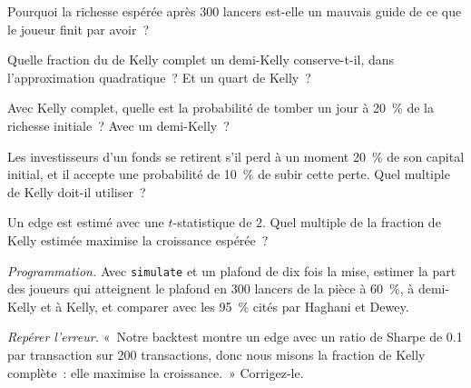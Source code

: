 \begin{exercise}[$\star$]\label{exo:m2:thinking-in-expected-value:2}
Pourquoi la richesse espérée après 300 lancers est-elle un mauvais guide de ce que le joueur finit par avoir~?
\end{exercise}

\begin{exercise}[$\star$]\label{exo:m2:thinking-in-expected-value:3}
Quelle fraction du  de Kelly complet un demi-Kelly conserve-t-il, dans l'approximation
quadratique~? Et un quart de Kelly~?
\end{exercise}

\begin{exercise}[$\star\star$]\label{exo:m2:thinking-in-expected-value:4}
Avec Kelly complet, quelle est la probabilité de tomber un jour à 20~\% de la richesse initiale~? Avec
un demi-Kelly~?
\end{exercise}

\begin{exercise}[$\star\star$]\label{exo:m2:thinking-in-expected-value:5}
Les investisseurs d'un fonds se retirent s'il perd à un moment 20~\% de son capital initial, et il accepte
une probabilité de 10~\% de subir cette perte. Quel multiple de Kelly doit-il utiliser~?
\end{exercise}

\begin{exercise}[$\star\star$]\label{exo:m2:thinking-in-expected-value:6}
Un edge est estimé avec une $t$-statistique de 2. Quel multiple de la fraction de Kelly estimée
maximise la croissance espérée~?
\end{exercise}

\begin{exercise}[$\star\star\star$]\label{exo:m2:thinking-in-expected-value:7}
\emph{Programmation.} Avec \texttt{simulate} et un plafond de dix fois la mise, estimer la part des
joueurs qui atteignent le plafond en 300 lancers de la pièce à 60~\%, à demi-Kelly et à Kelly,
et comparer avec les 95~\% cités par Haghani et Dewey.
\end{exercise}

\begin{exercise}[$\star\star\star$]\label{exo:m2:thinking-in-expected-value:8}
\emph{Repérer l'erreur.} «~Notre backtest montre un edge avec un ratio de Sharpe de 0.1 par transaction
sur 200 transactions, donc nous misons la fraction de Kelly complète~: elle maximise la croissance.~» Corrigez-le.
\end{exercise}


